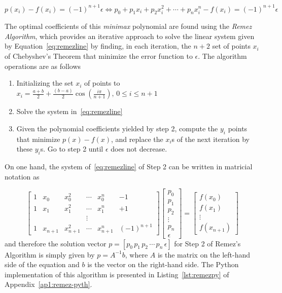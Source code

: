 \begin{equation}\label{eq:remezline}
    p(x_i) - f(x_i) = (-1)^{n+1} \epsilon \Leftrightarrow p_0 + p_1 x_i + p_2 x_i^2 + \cdots + p_n x_i^n - f(x_i) = (-1)^{n+1} \epsilon
\end{equation}

The optimal coefficients of this \textit{minimax} polynomial are found using the \textit{Remez Algorithm}, which provides an iterative approach to solve the linear system given by Equation~\ref{eq:remezline} by finding, in each iteration, the $n+2$ set of points $x_i$ of Chebyshev's Theorem that minimize the error function to $\epsilon$. The algorithm operations are as follows 

\begin{enumerate}
    \item Initializing the set $x_i$ of points to $x_i = \frac{a+b}{2} + \frac{(b-a)}{2}\cos\left(\frac{i\pi}{n+1}\right), \, 0 \leq i \leq n+1$ 
    \item Solve the system in~\ref{eq:remezline}
    \item Given the polynomial coefficients yielded by step 2, compute the $y_i$ points that minimize $p(x)-f(x)$, and replace the $x_i$s of the next iteration by these $y_i$s. Go to step 2 until $\epsilon$ does not decrease.
\end{enumerate}

On one hand, the system of~\ref{eq:remezline} of Step 2 can be written in matricial notation as

\begin{equation}
\begin{bmatrix} 1 & x_0 & x_0^2 & \cdots & x_0^n & - 1 \\ 1 & x_1 & x_1^2 & \cdots & x_1^n & + 1 \\  &  &  & \vdots & & \\ 1 & x_{n+1} & x_{n+1}^2 & \cdots & x_{n+1}^n & (-1)^{n+1} \end{bmatrix}
\begin{bmatrix} p_0 \\ p_1 \\ p_2 \\ \vdots \\ p_n \\ \epsilon \end{bmatrix} = \begin{bmatrix} f(x_0) \\ f(x_1) \\ \vdots \\ f(x_{n+1}) \end{bmatrix}
\end{equation}
and therefore the solution vector $p = \left[p_0 \, p_1 \, p_2 \, \cdots \, p_n \, \epsilon \right]$ for Step 2 of Remez's Algorithm is simply given by $p = A^{-1}b$, where $A$ is the matrix on the left-hand side of the equation and $b$ is the vector on the right-hand side. The Python implementation of this algorithm is presented in Listing~\ref{lst:remezpy} of Appendix~\ref{ap1:remez-pyth}.

